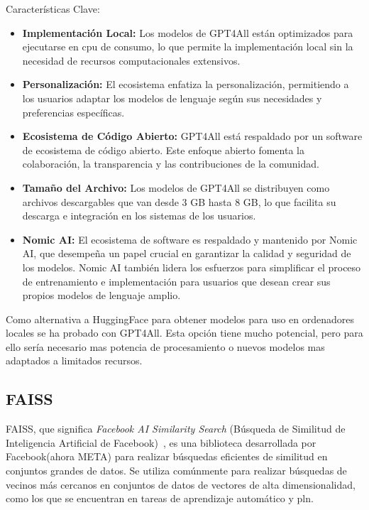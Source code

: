 Características Clave:
\begin{itemize}

\item \textbf{Implementación Local:} Los modelos de GPT4All están optimizados para ejecutarse en \acrshort{cpu} de consumo, lo que permite la implementación local sin la necesidad de recursos computacionales extensivos.
  
\item \textbf{Personalización:} El ecosistema enfatiza la personalización, permitiendo a los usuarios adaptar los modelos de lenguaje según sus necesidades y preferencias específicas.

\item \textbf{Ecosistema de Código Abierto:} GPT4All está respaldado por un software de ecosistema de código abierto. Este enfoque abierto fomenta la colaboración, la transparencia y las contribuciones de la comunidad.

\item \textbf{Tamaño del Archivo:} Los modelos de GPT4All se distribuyen como archivos descargables que van desde 3 GB hasta 8 GB, lo que facilita su descarga e integración en los sistemas de los usuarios.

\item \textbf{Nomic AI:} El ecosistema de software es respaldado y mantenido por Nomic AI, que desempeña un papel crucial en garantizar la calidad y seguridad de los modelos. Nomic AI también lidera los esfuerzos para simplificar el proceso de entrenamiento e implementación para usuarios que desean crear sus propios modelos de lenguaje amplio.
\end{itemize}

Como alternativa a HuggingFace para obtener modelos para uso en ordenadores locales se ha probado con GPT4All. Esta opción tiene mucho potencial, pero para ello sería necesario mas potencia de procesamiento o nuevos modelos mas adaptados a limitados recursos.

\subsection{FAISS}

FAISS, que significa \textit{Facebook AI Similarity Search} (Búsqueda de Similitud de Inteligencia Artificial de Facebook)~\cite{Faiss}, es una biblioteca desarrollada por Facebook(ahora META) para realizar búsquedas eficientes de similitud en conjuntos grandes de datos. Se utiliza comúnmente para realizar búsquedas de vecinos más cercanos en conjuntos de datos de vectores de alta dimensionalidad, como los que se encuentran en tareas de aprendizaje automático y \acrlong{pln}.

